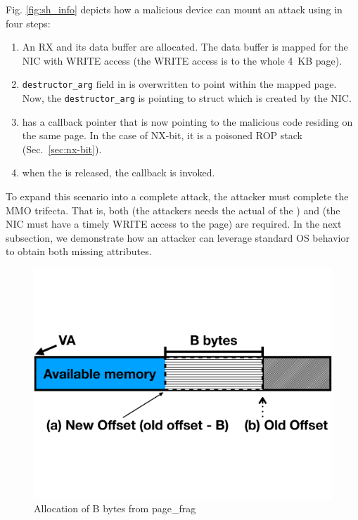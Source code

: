 Fig. \ref{fig:sh_info} depicts how a malicious device can mount an attack using \shinfo{} in four steps:
\begin{enumerate}[label=(\alph*)]
    \item An RX \skb{} and its data buffer are allocated. The data buffer is mapped for the NIC with WRITE access (the WRITE access is to the whole 4~KB page). 
    \item \texttt{destructor\_arg} field in \shinfo{} is overwritten to point within the mapped page. Now, the \texttt{destructor\_arg} is pointing to struct \uarg{} which is created by the NIC.
    \item \uarg{} has a callback pointer that is now pointing to the malicious code residing on the same page. In the case of NX-bit, it is a poisoned ROP stack (Sec.~\ref{sec:nx-bit}).
    \item when the \skb{} is released, the callback is invoked.
\end{enumerate}
To expand this scenario into a complete attack, the attacker must complete the MMO trifecta. That is, both \means{} (the attackers needs the actual \kva{} of the \mabaf{}) and \oportunity{} (the NIC must have a timely WRITE access to the page) are required. In the next subsection, we demonstrate how an attacker can leverage standard OS behavior to obtain both missing attributes.

\begin{figure}[t]
    \centering
    \includegraphics[width=0.8\linewidth,trim=0 6cm 0 6cm, clip]{figs/page_frag.pdf}
    \caption{Allocation of B bytes from page\_frag}
    \label{fig:page_frags}
\end{figure}

